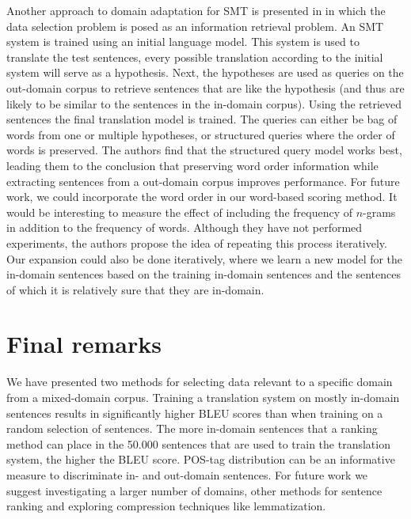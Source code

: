 \documentclass[11pt]{article}
\begin{document}
Another approach to domain adaptation for SMT is presented in \cite{query} in which the data selection problem is posed as an information retrieval problem. An SMT system is trained using an initial language model. This system is used to translate the test sentences, every possible translation according to the initial system will serve as a hypothesis. Next, the hypotheses are used as queries on the out-domain corpus to retrieve sentences that are like the hypothesis (and thus are likely to be similar to the sentences in the in-domain corpus). Using the retrieved sentences the final translation model is trained. The queries can either be bag of words from one or multiple hypotheses, or structured queries where the order of words is preserved. The authors find that the structured query model works best, leading them to the conclusion that preserving word order information while extracting sentences from a out-domain corpus improves performance. For future work, we could incorporate the word order in our word-based scoring method. It would be interesting to measure the effect of including the frequency of $n$-grams in addition to the frequency of words. Although they have not performed experiments, the authors propose the idea of repeating this process iteratively. Our expansion could also be done iteratively, where we learn a new model for the in-domain sentences based on the training in-domain sentences and the sentences of which it is relatively sure that they are in-domain.


\section{Final remarks}
\label{sec:conclusion}
We have presented two methods for selecting data relevant to a specific domain from a mixed-domain corpus. Training a translation system on mostly in-domain sentences results in significantly higher BLEU scores than when training on a random selection of sentences. The more in-domain sentences that a ranking method can place in the 50.000 sentences that are used to train the translation system, the higher the BLEU score. POS-tag distribution can be an informative measure to discriminate in- and out-domain sentences. For future work we suggest investigating a larger number of domains, other methods for sentence ranking and exploring compression techniques like lemmatization.  
\end{document}
